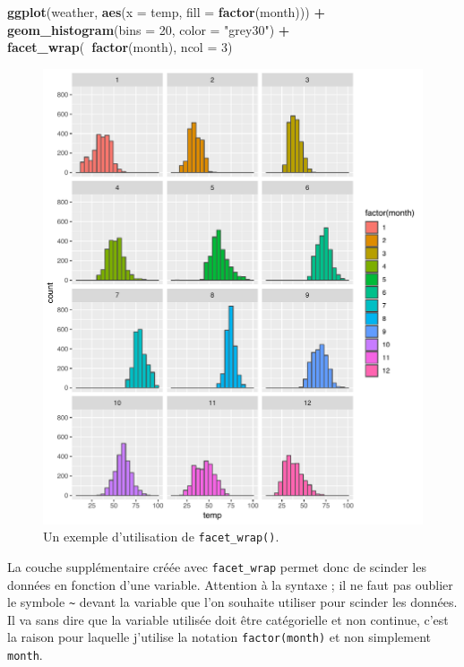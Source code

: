 \documentclass[a4paperpaper,]{article}
\newenvironment{Shaded}{\begin{snugshade}}{\end{snugshade}}
\newcommand{\KeywordTok}[1]{\textcolor[rgb]{0.13,0.29,0.53}{\textbf{#1}}}
\newcommand{\DataTypeTok}[1]{\textcolor[rgb]{0.13,0.29,0.53}{#1}}
\newcommand{\DecValTok}[1]{\textcolor[rgb]{0.00,0.00,0.81}{#1}}
\newcommand{\StringTok}[1]{\textcolor[rgb]{0.31,0.60,0.02}{#1}}
\newcommand{\OperatorTok}[1]{\textcolor[rgb]{0.81,0.36,0.00}{\textbf{#1}}}
\newcommand{\NormalTok}[1]{#1}
\theoremstyle{definition}
\theoremstyle{definition}
\theoremstyle{definition}
\theoremstyle{remark}
\begin{document}
\begin{Shaded}
\begin{Highlighting}[]
\KeywordTok{ggplot}\NormalTok{(weather, }\KeywordTok{aes}\NormalTok{(}\DataTypeTok{x =}\NormalTok{ temp, }\DataTypeTok{fill =} \KeywordTok{factor}\NormalTok{(month))) }\OperatorTok{+}
\StringTok{  }\KeywordTok{geom_histogram}\NormalTok{(}\DataTypeTok{bins =} \DecValTok{20}\NormalTok{, }\DataTypeTok{color =} \StringTok{"grey30"}\NormalTok{) }\OperatorTok{+}
\StringTok{  }\KeywordTok{facet_wrap}\NormalTok{(}\OperatorTok{~}\KeywordTok{factor}\NormalTok{(month), }\DataTypeTok{ncol =} \DecValTok{3}\NormalTok{)}
\end{Highlighting}
\end{Shaded}

\begin{figure}[htpb]

{\centering \includegraphics[width=0.9\linewidth]{figure/wrap-1} 

}

\caption{Un exemple d'utilisation de \texttt{facet\_wrap()}.}\label{fig:wrap}
\end{figure}



La couche supplémentaire créée avec \texttt{facet\_wrap} permet donc de
scinder les données en fonction d'une variable. Attention à la syntaxe ;
il ne faut pas oublier le symbole \texttt{\textasciitilde{}} devant la
variable que l'on souhaite utiliser pour scinder les données. Il va sans
dire que la variable utilisée doit être catégorielle et non continue,
c'est la raison pour laquelle j'utilise la notation
\texttt{factor(month)} et non simplement \texttt{month}.
\end{document}
